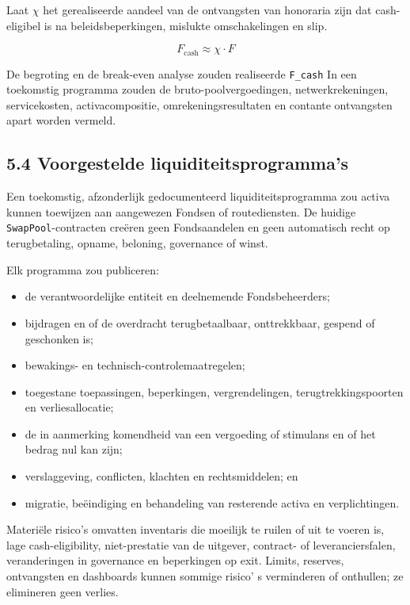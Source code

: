 \documentclass[11pt]{article}
\begin{document}
Laat \texttt{$\chi$} het gerealiseerde aandeel van de ontvangsten van honoraria zijn dat cash-eligibel is na beleidsbeperkingen, mislukte omschakelingen en slip.

\[
F_{\mathrm{cash}} \approx \chi \cdot F
\]

De begroting en de break-even analyse zouden realiseerde \texttt{F\_cash} In een toekomstig programma zouden de bruto-poolvergoedingen, netwerkrekeningen, servicekosten, activacompositie, omrekeningsresultaten en contante ontvangsten apart worden vermeld.

\subsection*{5.4 Voorgestelde liquiditeitsprogramma's}

Een toekomstig, afzonderlijk gedocumenteerd liquiditeitsprogramma zou activa kunnen toewijzen aan aangewezen Fondsen of routediensten. De huidige \texttt{SwapPool}-contracten creëren geen Fondsaandelen en geen automatisch recht op terugbetaling, opname, beloning, governance of winst.

Elk programma zou publiceren:

\begin{itemize}[leftmargin=*]
\item de verantwoordelijke entiteit en deelnemende Fondsbeheerders;
\item bijdragen en of de overdracht terugbetaalbaar, onttrekkbaar, gespend of geschonken is;
\item bewakings- en technisch-controlemaatregelen;
\item toegestane toepassingen, beperkingen, vergrendelingen, terugtrekkingspoorten en verliesallocatie;
\item de in aanmerking komendheid van een vergoeding of stimulans en of het bedrag nul kan zijn;
\item verslaggeving, conflicten, klachten en rechtsmiddelen; en
\item migratie, beëindiging en behandeling van resterende activa en verplichtingen.
\end{itemize}
Materiële risico's omvatten inventaris die moeilijk te ruilen of uit te voeren is, lage cash-eligibility, niet-prestatie van de uitgever, contract- of leveranciersfalen, veranderingen in governance en beperkingen op exit. Limits, reserves, ontvangsten en dashboards kunnen sommige risico' s verminderen of onthullen; ze elimineren geen verlies.
\end{document}

